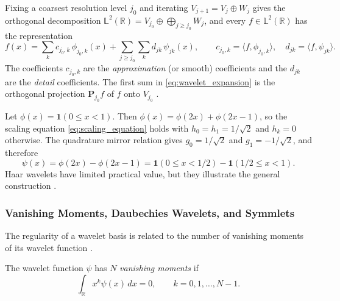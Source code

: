 Fixing a coarsest resolution level $j_0$ and iterating
$V_{j+1} = V_j\oplus W_j$ gives the orthogonal decomposition
$\mathbb{L}^2(\mathbb{R}) = V_{j_0}\oplus\bigoplus_{j\geq j_0}W_j$, and
every $f\in\mathbb{L}^2(\mathbb{R})$
has the representation \cite[Sec.~3.5.3]{vidakovic1999}
\begin{equation}
f(x) = \sum_kc_{j_0,k}\,\phi_{j_0,k}(x) + \sum_{j\geq j_0}\sum_k
d_{jk}\,\psi_{jk}(x),\qquad c_{j_0,k} = \langle f,\phi_{j_0,k}\rangle,\quad
d_{jk} = \langle f,\psi_{jk}\rangle.
\label{eq:wavelet_expansion}
\end{equation}
The coefficients $c_{j_0,k}$ are the \emph{approximation} (or smooth)
coefficients and the $d_{jk}$ are the \emph{detail} coefficients. The first sum in \eqref{eq:wavelet_expansion} is the orthogonal projection
$\mathbf{P}_{j_0}f$ of $f$ onto $V_{j_0}$ \cite[Sec.~3.5.3]{vidakovic1999}.

\begin{example}
\label{ex:haar}
Let $\phi(x) = \mathbf{1}(0\leq x<1)$. Then $\phi(x) = \phi(2x)+\phi(2x-1)$,
so the scaling equation \eqref{eq:scaling_equation} holds with
$h_0 = h_1 = 1/\sqrt{2}$ and $h_k = 0$ otherwise. The quadrature mirror relation
gives $g_0 = 1/\sqrt{2}$ and $g_1 = -1/\sqrt{2}$, and therefore
\begin{equation*}
\psi(x) = \phi(2x)-\phi(2x-1) = \mathbf{1}(0\leq x<1/2) -
\mathbf{1}(1/2\leq x<1).
\end{equation*}
Haar wavelets have limited practical value, but they illustrate the
general construction \cite[Sec.~3.4.1]{vidakovic1999}.
\end{example}

\subsubsection{Vanishing Moments, Daubechies Wavelets, and Symmlets}

The regularity of a wavelet basis is related to the number of vanishing
moments of its wavelet function \cite[Sec.~3.5.1]{vidakovic1999}.

\begin{definition}
\label{def:vanishing_moments}
The wavelet function $\psi$ has $N$ \emph{vanishing moments} if
\begin{equation}
\int_{\mathbb{R}}x^k\psi(x)\,dx = 0,\qquad k = 0,1,\dots,N-1.
\label{eq:vanishing_moments}
\end{equation}
\end{definition}

